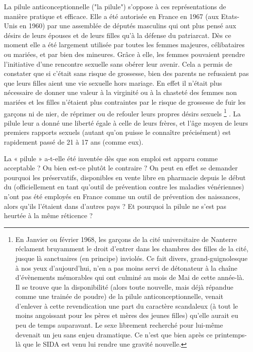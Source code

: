  La pilule anticonceptionnelle ("la pilule") s'oppose à ces représentations de manière pratique et efficace. Elle a été autorisée en France en 1967 (aux Etats-Unis en 1960) par une assemblée de députés masculins qui ont plus pensé aux désirs de leurs épouses et de leurs filles qu'à la défense du patriarcat. Dès ce moment elle a été largement utilisée par toutes les femmes majeures, célibataires ou mariées, et par bien des mineures. Grâce à elle, les femmes pouvaient prendre l'initiative d'une rencontre sexuelle sans obérer leur avenir. Cela a permis de constater que si c'était sans risque de grossesse, bien des parents ne refusaient pas que leurs filles aient une vie sexuelle hors mariage. En effet il n'était plus nécessaire de donner une valeur à la virginité ou à la chasteté des femmes non mariées et les filles n'étaient plus contraintes par le risque de grossesse de fuir les garçons ni de nier, de réprimer ou de refouler leurs propres désirs sexuels
\footnote{En Janvier ou février 1968, les garçons de la cité universitaire de Nanterre réclament bruyamment le droit d'entrer dans les chambres des filles de la cité, jusque là sanctuaires (en principe) inviolés. Ce fait divers, grand-guignolesque à nos yeux d'aujourd'hui, n'en a pas moins servi de détonateur à la chaîne d'évènements mémorables qui ont culminé au mois de Mai de cette année-là. Il se trouve que la disponibilité (alors toute nouvelle, mais déjà répandue comme une trainée de poudre) de la pilule anticonceptionnelle, venait d'enlever à cette revendication une part du caractère scandaleux (à tout le moins angoissant pour les pères et mères des jeunes filles) qu'elle aurait eu peu de temps auparavant. Le sexe librement recherché pour lui-même devenait un jeu sans enjeu dramatique. Ce n'est que bien après ce printemps-là que le SIDA est venu lui rendre une gravité nouvelle.}%
. La pilule leur a donné une liberté égale à celle de leurs frères, et l'âge moyen de leurs premiers rapports sexuels (autant qu'on puisse le connaître précisément) est rapidement passé de 21 à 17 ans (comme eux).

 La « pilule » a-t-elle été inventée dès que son emploi est apparu comme acceptable ? Ou bien est-ce plutôt le contraire ? On peut en effet se demander pourquoi les préservatifs, disponibles en vente libre en pharmacie depuis le début du  (officiellement en tant qu'outil de prévention contre les maladies vénériennes) n'ont pas été employés en France comme un outil de prévention des naissances, alors qu'ils l'étaient dans d'autres pays ? Et pourquoi la pilule ne s'est pas heurtée à la même réticence ? 

